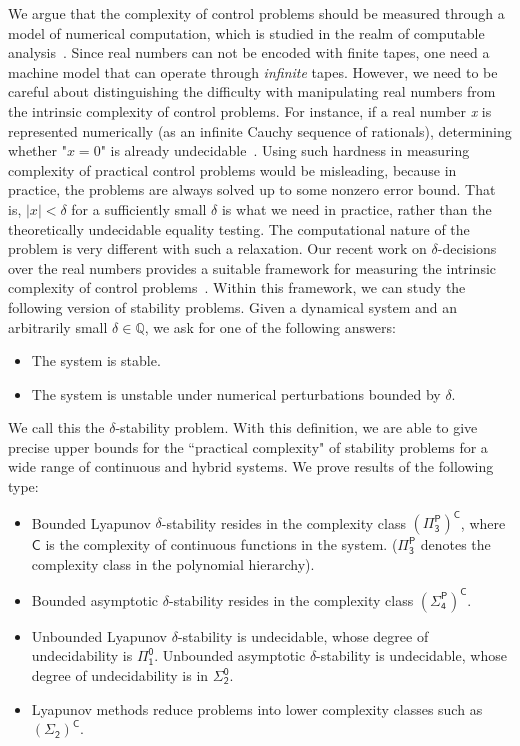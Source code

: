 \documentclass[10pt]{article}
\theoremstyle{plain}
\theoremstyle{definition}
\begin{document}
We argue that the complexity of control problems should be measured through a model of numerical computation, which is studied in the realm of computable analysis~\cite{CAbook,Kobook,16557}. Since real numbers can not be encoded with finite tapes, one need a machine model that can operate through {\em infinite} tapes. However, we need to be careful about distinguishing the difficulty with manipulating real numbers from the intrinsic complexity of control problems. For instance, if a real number {\em x} is represented numerically (as an infinite Cauchy sequence of rationals), determining whether "$x=0$" is already undecidable~\cite{CAbook}. Using such hardness in measuring complexity of practical control problems would be misleading, because in practice, the problems are always solved up to some nonzero error bound. That is, $|x|<\delta$ for a sufficiently small $\delta$ is what we need in practice, rather than the theoretically undecidable equality testing. The computational nature of the problem is very different with such a relaxation. Our recent work on $\delta$-decisions over the real numbers provides a suitable framework for measuring the intrinsic complexity of control problems~\cite{DBLP:conf/lics/GaoAC12,DBLP:conf/cade/GaoAC12}. Within this framework, we can study the following version of stability problems. Given a dynamical system and an arbitrarily small $\delta\in \mathbb{Q}$, we ask for one of the following answers:
\begin{itemize}
\item The system is stable. 
\item The system is unstable under numerical perturbations bounded by $\delta$. 
\end{itemize}
We call this the $\delta$-stability problem. With this definition, we are able to give precise upper bounds for the ``practical complexity" of stability problems for a wide range of continuous and hybrid systems. We prove results of the following type:
\begin{itemize}
\item Bounded Lyapunov $\delta$-stability resides in the complexity class $\mathsf{(\Pi^P_3)^C}$, where $\mathsf{C}$ is the complexity of continuous functions in the system. ($\mathsf{\Pi^P_3}$ denotes the complexity class in the polynomial hierarchy).
\item Bounded asymptotic $\delta$-stability resides in the complexity class $\mathsf{(\Sigma^P_4)^C}$. 
\item Unbounded Lyapunov $\delta$-stability is undecidable, whose degree of undecidability is $\mathsf{\Pi^0_1}$. Unbounded asymptotic $\delta$-stability is undecidable, whose degree of undecidability is in $\mathsf{\Sigma^0_2}$.
\item Lyapunov methods reduce problems into lower complexity classes such as $\mathsf{(\Sigma_2)^C}$.  
\end{itemize}
\end{document}
